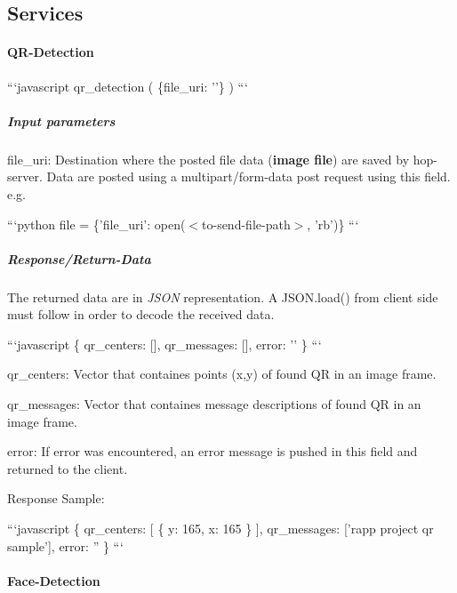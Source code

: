\subsection*{Services}

\paragraph*{Q\-R-\/\-Detection}

```javascript qr\-\_\-detection ( \{file\-\_\-uri\-: ''\} ) ```

\subparagraph*{Input parameters}


\begin{DoxyItemize}
\item file\-\_\-uri\-: Destination where the posted file data ({\bfseries image file}) are saved by hop-\/server. Data are posted using a multipart/form-\/data post request using this field. e.\-g.
\end{DoxyItemize}

```python file = \{'file\-\_\-uri'\-: open($<$to-\/send-\/file-\/path$>$, 'rb')\} ```

\subparagraph*{Response/\-Return-\/\-Data}

The returned data are in {\itshape J\-S\-O\-N} representation. A J\-S\-O\-N.\-load() from client side must follow in order to decode the received data.

```javascript \{ qr\-\_\-centers\-: \mbox{[}\mbox{]}, qr\-\_\-messages\-: \mbox{[}\mbox{]}, error\-: '' \} ```


\begin{DoxyItemize}
\item qr\-\_\-centers\-: Vector that containes points (x,y) of found Q\-R in an image frame.
\item qr\-\_\-messages\-: Vector that containes message descriptions of found Q\-R in an image frame.
\item error\-: If error was encountered, an error message is pushed in this field and returned to the client.
\end{DoxyItemize}

Response Sample\-:

```javascript \{ qr\-\_\-centers\-: \mbox{[} \{ y\-: 165, x\-: 165 \} \mbox{]}, qr\-\_\-messages\-: \mbox{[}'rapp project qr sample'\mbox{]}, error\-: '' \} ```

\paragraph*{Face-\/\-Detection}

